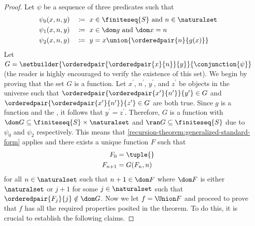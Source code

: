 \begin{proof}
    \vspace{0.1cm}
    \noindent
    Let \( \psi \) be a sequence of three predicates such that
    \begin{alignat*}{2}
        &\psi_{0}(x, n, y) &&\coloneq \ x \in \finiteseq{S} \ \text{and} \ n \in \naturalset \\
        &\psi_{1}(x, n, y) &&\coloneq \ x \in \dom g \ \text{and}\ \dom x = n\\
        &\psi_{2}(x, n, y) &&\coloneq \ y = x \union \mleft\{ \orderedpair{n}{g(x)} \mright\}
    \end{alignat*}
    Let \( G = \setbuilder{\orderedpair{\orderedpair{x}{n}}{y}}{\conjunction{\psi}} \) (the reader is highly encouraged to verify the existence of this set).
    We begin by proving that the set \( G \) is a function.
    Let \( x^{\prime} \), \( n^{\prime} \), \( y^{\prime} \), and \( z^{\prime} \) be objects in the universe such that
    \( \orderedpair{\orderedpair{x^{\prime}}{n^{\prime}}}{y^{\prime}} \in G \) and \( \orderedpair{\orderedpair{x^{\prime}}{n^{\prime}}}{z^{\prime}} \in G \) are both true.
    Since \( g \) is a function and the , it follows that \( y^{\prime} = z^{\prime} \).
    Therefore, \( G \) is a function with \( \dom G \subseteq \finiteseq{S} \times \naturalset \) and \( \ran G \subseteq \finiteseq{S} \) due to \( \psi_{0} \) and
    \( \psi_{2} \) respectively.
    This means that \cref{recursion-theorem:generalized-standard-form} applies and there exists a unique function
    \( F \) such that
    \begin{equation}
        \label{eq:values-of-F-2}
        \begin{aligned}
            F_{0} &\\
            F_{n + 1} &
        \end{aligned}
        \begin{aligned}
            &= \tuple{}\\
            &= G(F_{n}, n)
        \end{aligned}
    \end{equation}
    for all \( n \in \naturalset \) such that \( n + 1 \in \dom F \) where \( \dom F \) is either \( \naturalset \) or \( j + 1 \) for some \( j \in \naturalset \)
    such that \( \orderedpair{F_{j}}{j} \notin \dom G \).
    Now we let \( f = \Union F  \) and proceed to prove that \( f \) has all the required properties posited in the theorem.
    To do this, it is crucial to establish the following claims.


\end{proof}
